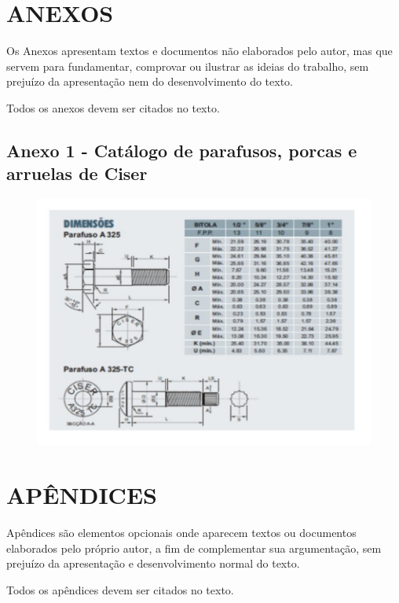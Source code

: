 \documentclass[a4paper,12pt,oneside]{article}
\numberwithin{equation}{section}
\begin{document}
\section{ANEXOS}

Os Anexos apresentam textos e documentos não elaborados pelo autor, mas que servem para fundamentar, comprovar ou ilustrar as ideias do trabalho, sem prejuízo da apresentação nem do desenvolvimento do texto.

Todos os anexos devem ser citados no texto.


\subsection{Anexo 1 - Catálogo de parafusos, porcas e arruelas de Ciser}
\begin{figure}[h]
\centering
\includegraphics[width=1\linewidth]{img/catalogo}
\end{figure}

\section{APÊNDICES}

Apêndices são elementos opcionais onde aparecem textos ou documentos elaborados pelo próprio autor, a fim de complementar sua argumentação, sem prejuízo da apresentação e
desenvolvimento normal do texto.


Todos os apêndices devem ser citados no texto.
\end{document}
